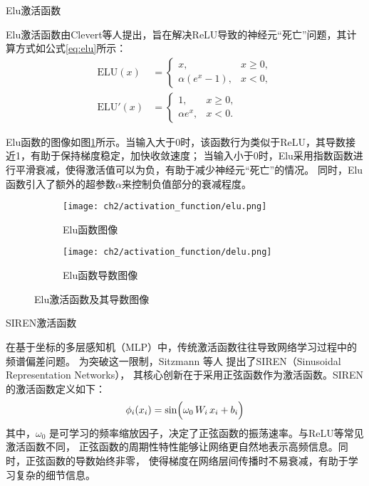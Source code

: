  Elu激活函数

Elu激活函数由Clevert等人\cite{ClevertUH15}提出，旨在解决ReLU导致的神经元“死亡”问题，其计算方式如公式\eqref{eq:elu}所示：
\begin{equation}
  \begin{aligned}
  \text{ELU}(x) &= \begin{cases}
  x, & x \geq 0, \\
  \alpha \left(e^x - 1\right), & x < 0,
  \end{cases} \\
  \text{ELU}'(x) &= \begin{cases}
  1, & x \geq 0, \\
  \alpha e^x, & x < 0.
  \end{cases}
  \end{aligned}
  \label{eq:elu}
\end{equation}

Elu函数的图像如图\ref{fig:elu}所示。当输入大于0时，该函数行为类似于ReLU，其导数接近1，有助于保持梯度稳定，加快收敛速度；
当输入小于0时，Elu采用指数函数进行平滑衰减，使得激活值可以为负，有助于减少神经元“死亡”的情况。
同时，Elu函数引入了额外的超参数$\alpha$来控制负值部分的衰减程度。

\begin{figure}[H]
  \centering
  \begin{subfigure}[t]{0.45\textwidth}
    \centering
    \texttt{[image: ch2/activation\_function/elu.png]}
    \caption{Elu函数图像}
  \end{subfigure}
  \begin{subfigure}[t]{0.45\textwidth}
    \centering
    \texttt{[image: ch2/activation\_function/delu.png]}
    \caption{Elu函数导数图像}
  \end{subfigure}
  \caption{Elu激活函数及其导数图像}
  \label{fig:elu}
\end{figure}

 SIREN激活函数

在基于坐标的多层感知机（MLP）中，传统激活函数往往导致网络学习过程中的频谱偏差问题。
为突破这一限制，Sitzmann 等人\cite{sitzmann2020implicit} 提出了SIREN（Sinusoidal Representation Networks），
其核心创新在于采用正弦函数作为激活函数。SIREN的激活函数定义如下：
\begin{equation}\label{eq:siren}
\phi_i(x_i)=\sin\Bigl(\omega_0\,W_i\,x_i+b_i\Bigr)
\end{equation}
其中，$\omega_0$ 是可学习的频率缩放因子，决定了正弦函数的振荡速率。与ReLU等常见激活函数不同，
正弦函数的周期性特性能够让网络更自然地表示高频信息。同时，正弦函数的导数始终非零，
使得梯度在网络层间传播时不易衰减，有助于学习复杂的细节信息。

